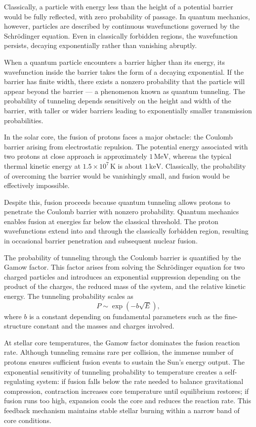 Classically, a particle with energy less than the height of a potential barrier would be fully reflected, with zero probability of passage. In quantum mechanics, however, particles are described by continuous wavefunctions governed by the Schrödinger equation. Even in classically forbidden regions, the wavefunction persists, decaying exponentially rather than vanishing abruptly.

When a quantum particle encounters a barrier higher than its energy, its wavefunction inside the barrier takes the form of a decaying exponential. If the barrier has finite width, there exists a nonzero probability that the particle will appear beyond the barrier — a phenomenon known as quantum tunneling. The probability of tunneling depends sensitively on the height and width of the barrier, with taller or wider barriers leading to exponentially smaller transmission probabilities.

In the solar core, the fusion of protons faces a major obstacle: the Coulomb barrier arising from electrostatic repulsion. The potential energy associated with two protons at close approach is approximately $1\,\text{MeV}$, whereas the typical thermal kinetic energy at $1.5 \times 10^7\,\text{K}$ is about $1\,\text{keV}$. Classically, the probability of overcoming the barrier would be vanishingly small, and fusion would be effectively impossible.

Despite this, fusion proceeds because quantum tunneling allows protons to penetrate the Coulomb barrier with nonzero probability. Quantum mechanics enables fusion at energies far below the classical threshold. The proton wavefunctions extend into and through the classically forbidden region, resulting in occasional barrier penetration and subsequent nuclear fusion.

The probability of tunneling through the Coulomb barrier is quantified by the Gamow factor. This factor arises from solving the Schrödinger equation for two charged particles and introduces an exponential suppression depending on the product of the charges, the reduced mass of the system, and the relative kinetic energy. The tunneling probability scales as
\[
P \sim \exp\left( -b\sqrt{E} \right),
\]
where \( b \) is a constant depending on fundamental parameters such as the fine-structure constant and the masses and charges involved.

At stellar core temperatures, the Gamow factor dominates the fusion reaction rate. Although tunneling remains rare per collision, the immense number of protons ensures sufficient fusion events to sustain the Sun's energy output. The exponential sensitivity of tunneling probability to temperature creates a self-regulating system: if fusion falls below the rate needed to balance gravitational compression, contraction increases core temperature until equilibrium restores; if fusion runs too high, expansion cools the core and reduces the reaction rate. This feedback mechanism maintains stable stellar burning within a narrow band of core conditions.

